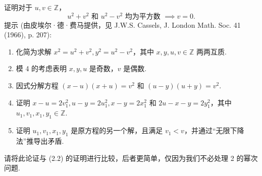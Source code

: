 \begin{exercise}
证明对于 \(u, v \in \mathbb{Z}\)，
\[
u^2+v^2 \text{ 和 } u^2-v^2 \text{ 均为平方数 } \implies v=0.
\]
提示 (由皮埃尔·德·费马提供，见 J.W.S. Cassels, J. London Math. Soc. 41 (1966), p. 207):
\begin{enumerate}
    \item[第一步] 化简为求解 \(x^2 = u^2+v^2, y^2 = u^2-v^2\)，其中 \(x, y, u, v \in \mathbb{Z}\) 两两互质.
    \item[第二步] 模 4 的考虑表明 \(x, y, u\) 是奇数，\(v\) 是偶数.
    \item[第三步] 因式分解方程 \((x-u)(x+u)=v^2\) 和 \((u-y)(u+y)=v^2\).
    \item[第四步] 证明 \(x-u=2v_1^2, u-y=2u_1^2, x-y=2x_1^2\) 和 \(2u-x-y=2y_1^2\)，其中 \(u_1, v_1, x_1, y_1 \in \mathbb{Z}\).
    \item[第五步] 证明 \(u_1, v_1, x_1, y_1\) 是原方程的另一个解，且满足 \(v_1 < v\)，并通过“无限下降法”推导出矛盾.
\end{enumerate}
请将此论证与 (2.2) 的证明进行比较，后者更简单，仅因为我们不必处理 2 的幂次问题.
\end{exercise}